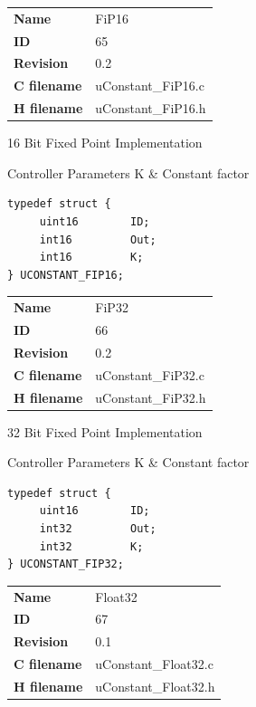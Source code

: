 \ifdefined \AddTestReports
{}
\fi
{}
\nopagebreak[0]
\begin{tabular}{l l}
\textbf{Name} & FiP16 \tabularnewline
\textbf{ID} & 65 \tabularnewline
\textbf{Revision} & 0.2 \tabularnewline
\textbf{C filename} & uConstant\_FiP16.c \tabularnewline
\textbf{H filename} & uConstant\_FiP16.h \tabularnewline
\end{tabular}
\vspace{1ex}

16 Bit Fixed Point Implementation

\begin{XtoCtabular}{Controller Parameters}
K & Constant factor\tabularnewline
\hline
\end{XtoCtabular}

\begin{lstlisting}
typedef struct {
     uint16        ID;
     int16         Out;
     int16         K;
} UCONSTANT_FIP16;
\end{lstlisting}

\ifdefined \AddTestReports
{}
\fi
{}
\nopagebreak[0]
\begin{tabular}{l l}
\textbf{Name} & FiP32 \tabularnewline
\textbf{ID} & 66 \tabularnewline
\textbf{Revision} & 0.2 \tabularnewline
\textbf{C filename} & uConstant\_FiP32.c \tabularnewline
\textbf{H filename} & uConstant\_FiP32.h \tabularnewline
\end{tabular}
\vspace{1ex}

32 Bit Fixed Point Implementation

\begin{XtoCtabular}{Controller Parameters}
K & Constant factor\tabularnewline
\hline
\end{XtoCtabular}

\begin{lstlisting}
typedef struct {
     uint16        ID;
     int32         Out;
     int32         K;
} UCONSTANT_FIP32;
\end{lstlisting}

\ifdefined \AddTestReports
{}
\fi
{}
\nopagebreak[0]
\begin{tabular}{l l}
\textbf{Name} & Float32 \tabularnewline
\textbf{ID} & 67 \tabularnewline
\textbf{Revision} & 0.1 \tabularnewline
\textbf{C filename} & uConstant\_Float32.c \tabularnewline
\textbf{H filename} & uConstant\_Float32.h \tabularnewline
\end{tabular}
\vspace{1ex}

